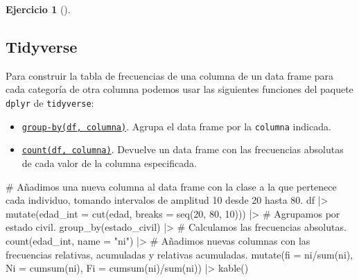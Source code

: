 \documentclass[
  a4paper,
]{scrreport}
\newenvironment{Shaded}{\begin{snugshade}}{\end{snugshade}}
\newcommand{\AttributeTok}[1]{\textcolor[rgb]{0.40,0.45,0.13}{#1}}
\newcommand{\CommentTok}[1]{\textcolor[rgb]{0.37,0.37,0.37}{#1}}
\newcommand{\DecValTok}[1]{\textcolor[rgb]{0.68,0.00,0.00}{#1}}
\newcommand{\FunctionTok}[1]{\textcolor[rgb]{0.28,0.35,0.67}{#1}}
\newcommand{\NormalTok}[1]{\textcolor[rgb]{0.00,0.23,0.31}{#1}}
\newcommand{\SpecialCharTok}[1]{\textcolor[rgb]{0.37,0.37,0.37}{#1}}
\newcommand{\StringTok}[1]{\textcolor[rgb]{0.13,0.47,0.30}{#1}}
\theoremstyle{definition}
\newtheorem{exercise}{Ejercicio}[chapter]
\theoremstyle{remark}
\begin{document}
\begin{exercise}[]
\begin{enumerate}
\begin{tcolorbox}
  \section{Tidyverse}

  Para construir la tabla de frecuencias de una columna de un data frame
  para cada categoría de otra columna podemos usar las siguientes
  funciones del paquete \texttt{dplyr} de \texttt{tidyverse}:

  \begin{itemize}
  \item
    \href{https://aprendeconalf.es/manual-r/06-preprocesamiento.html\#res\%C3\%BAmenes-por-grupos}{\texttt{group-by(df,\ columna)}}.
    Agrupa el data frame por la \texttt{columna} indicada.
  \item
    \href{https://aprendeconalf.es/manual-r/06-preprocesamiento.html\#conteo-del-n\%C3\%BAmero-de-observaciones}{\texttt{count(df,\ columna)}}.
    Devuelve un data frame con las frecuencias absolutas de cada valor
    de la columna especificada.
  \end{itemize}

\begin{Shaded}
\begin{Highlighting}[]
\CommentTok{\# Añadimos una nueva columna al data frame con la clase a la que pertenece cada individuo, tomando intervalos de amplitud 10 desde 20 hasta 80.}
\NormalTok{df }\SpecialCharTok{|\textgreater{}} \FunctionTok{mutate}\NormalTok{(}\AttributeTok{edad\_int =} \FunctionTok{cut}\NormalTok{(edad, }\AttributeTok{breaks =} \FunctionTok{seq}\NormalTok{(}\DecValTok{20}\NormalTok{, }\DecValTok{80}\NormalTok{, }\DecValTok{10}\NormalTok{))) }\SpecialCharTok{|\textgreater{}}
    \CommentTok{\# Agrupamos por estado civil.}
    \FunctionTok{group\_by}\NormalTok{(estado\_civil) }\SpecialCharTok{|\textgreater{}}
    \CommentTok{\# Calculamos las frecuencias absolutas.}
    \FunctionTok{count}\NormalTok{(edad\_int, }\AttributeTok{name =} \StringTok{"ni"}\NormalTok{) }\SpecialCharTok{|\textgreater{}} 
    \CommentTok{\# Añadimos nuevas columnas con las frecuencias relativas, acumuladas y relativas acumuladas.}
    \FunctionTok{mutate}\NormalTok{(}\AttributeTok{fi =}\NormalTok{ ni}\SpecialCharTok{/}\FunctionTok{sum}\NormalTok{(ni), }\AttributeTok{Ni =} \FunctionTok{cumsum}\NormalTok{(ni), }\AttributeTok{Fi =} \FunctionTok{cumsum}\NormalTok{(ni)}\SpecialCharTok{/}\FunctionTok{sum}\NormalTok{(ni)) }\SpecialCharTok{|\textgreater{}}
    \FunctionTok{kable}\NormalTok{()}
\end{Highlighting}
\end{Shaded}


\end{tcolorbox}
\end{enumerate}
\end{exercise}
\end{document}
